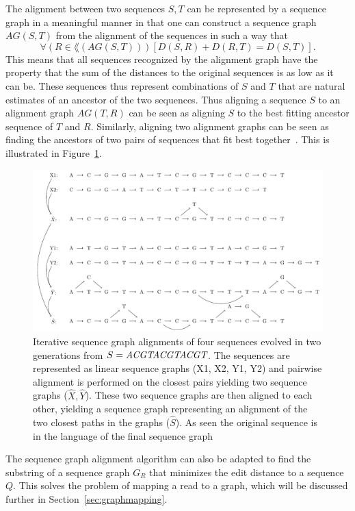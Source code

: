 The alignment between two sequences $S, T$ can be represented by a sequence graph in a meaningful manner in that one can construct a sequence graph $AG(S, T)$ from the alignment of the sequences in such a way that 
\[
\forall (R \in \lang(AG(S, T)))\left[D(S, R)+D(R, T) =  D(S, T)\right].
\]
This means that all sequences recognized by the alignment graph have the property that the sum of the distances to the original sequences is as low as it can be.
These sequences thus represent combinations of $S$ and $T$ that are natural estimates of an ancestor of the two sequences.
Thus aligning a sequence $S$ to an alignment graph $AG(T, R)$  can be seen as aligning $S$ to the best fitting ancestor sequence of $T$ and $R$.
Similarly, aligning two alignment graphs can be seen as finding the ancestors of two pairs of sequences that fit best together~\cite{treealign, poa2}.
This is illustrated in Figure~\ref{fig:treealign}.

\begin{figure}
  \includegraphics[width=\textwidth]{figures/graph_msa}

  \caption{
    Iterative sequence graph alignments of four sequences evolved in two generations from $S=\emph{ACGTACGTACGT}$.
    The sequences are represented as linear sequence graphs (X1, X2, Y1, Y2) and pairwise alignment is performed on the closest pairs yielding two sequence graphs ($\hat{X}, \hat{Y}$).
    These two sequence graphs are then aligned to each other, yielding a sequence graph representing an alignment of the two closest paths in the graphs ($\hat{S}$).
    As seen the original sequence is in the language of the final sequence graph}
  \label{fig:treealign}
\end{figure}

The sequence graph alignment algorithm can also be adapted to find the substring of a sequence graph $G_R$ that minimizes the edit distance to a sequence $Q$.
This solves the problem of mapping a read to a graph, which will be discussed further in Section~\ref{sec:graphmapping}.


